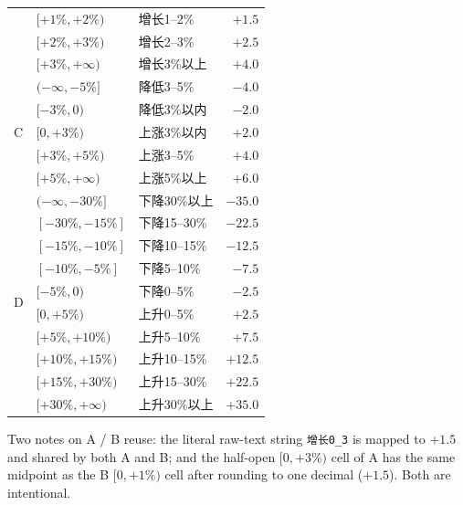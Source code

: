 \documentclass[11pt,letterpaper,english,final]{article}
\begin{document}
\begin{table}[H]
\begin{tabular}{@{}l l l r@{}}
                   & $[+1\%,+2\%)$      & 增长1--2\%       & $+1.5$ \\
                   & $[+2\%,+3\%)$      & 增长2--3\%       & $+2.5$ \\
                   & $[+3\%,+\infty)$   & 增长3\%以上      & $+4.0$ \\
\midrule
\multirow{5}{*}{C} & $(-\infty,-5\%]$   & 降低3--5\%       & $-4.0$ \\
                   & $[-3\%,0)$         & 降低3\%以内      & $-2.0$ \\
                   & $[0,+3\%)$         & 上涨3\%以内      & $+2.0$ \\
                   & $[+3\%,+5\%)$      & 上涨3--5\%       & $+4.0$ \\
                   & $[+5\%,+\infty)$   & 上涨5\%以上      & $+6.0$ \\
\midrule
\multirow{10}{*}{D} & $(-\infty,-30\%]$   & 下降30\%以上      & $-35.0$ \\
                    & $[-30\%,-15\%]$     & 下降15--30\%      & $-22.5$ \\
                    & $[-15\%,-10\%]$     & 下降10--15\%      & $-12.5$ \\
                    & $[-10\%,-5\%]$      & 下降5--10\%       & $-7.5$  \\
                    & $[-5\%,0)$          & 下降0--5\%        & $-2.5$  \\
                    & $[0,+5\%)$          & 上升0--5\%        & $+2.5$  \\
                    & $[+5\%,+10\%)$      & 上升5--10\%       & $+7.5$  \\
                    & $[+10\%,+15\%)$     & 上升10--15\%      & $+12.5$ \\
                    & $[+15\%,+30\%)$     & 上升15--30\%      & $+22.5$ \\
                    & $[+30\%,+\infty)$   & 上升30\%以上      & $+35.0$ \\
\bottomrule
\end{tabular}
\end{table}

Two notes on A / B reuse: the literal raw-text string \texttt{增长0\_3} is mapped to $+1.5$ and shared by both A and B; and the half-open $[0,+3\%)$ cell of A has the same midpoint as the B $[0,+1\%)$ cell after rounding to one decimal ($+1.5$). Both are intentional.
\end{document}
